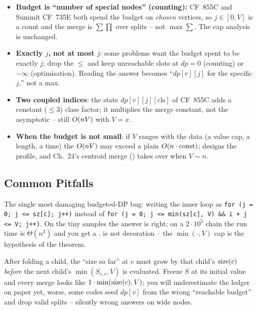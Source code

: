 \begin{itemize}[nosep]
  \item \textbf{Budget is ``number of special nodes'' (counting):} CF~855C and
        Summit CF~735E both spend the budget on \emph{chosen} vertices, so
        $j\in[0,V]$ is a count and the merge is $\sum\!\prod$ over splits --
        not $\max\!\sum$. The cap analysis is unchanged. \hfill{}
  \item \textbf{Exactly $j$, not at most $j$}: some problems want the budget
        spent to be exactly $j$; drop the $\le$ and keep unreachable slots at
        $\mathit{dp}=0$ (counting) or $-\infty$ (optimisation). Reading the
        answer becomes ``$\mathit{dp}[r][j]$ for the specific $j$,'' not a max. \hfill{}
  \item \textbf{Two coupled indices}: the state $\mathit{dp}[v][j][\text{cls}]$
        of CF~855C adds a constant ($\le 3$) class factor; it multiplies the
        merge constant, not the asymptotic -- still $O(nV)$ with $V=x$. \hfill{}
  \item \textbf{When the budget is not small}: if $V$ ranges with the data
        (a value cap, a length, a time) the $O(nV)$ may exceed a plain
        $O(n\cdot\text{const})$;  designs the profile,
        and Ch.~24's centroid merge () takes over when $V \sim n$. \hfill{}
\end{itemize}

\subsection{Common Pitfalls}

\begin{warningbox}
The single most damaging budgeted-DP bug: writing the inner loop as
\lstinline{for (j = 0; j <= sz[c]; j++)} instead of
\lstinline{for (j = 0; j <= min(sz[c], V) && i + j <= V; j++)}. On the tiny
samples the answer is right; on a $2\cdot10^{5}$ chain the run time is
$\Theta(n^2)$ and you get a \tle.  is not decoration --
the $\min(\cdot,V)$ cap is the hypothesis of the theorem.
\end{warningbox}

\begin{warningbox}
After folding a child, the ``size so far'' at $v$ must grow by that child's
$\operatorname{size}(c)$ \emph{before} the next child's $\min(S_{v,c},V)$ is evaluated.
Freeze $S$ at its initial value and every merge looks like $1 \cdot \min(\operatorname{size}(c),V)$;
you will underestimate the ledger on paper yet, worse, some codes seed
$\mathit{dp}[v]$ from the wrong ``reachable budget'' and drop valid splits --
silently wrong answers on wide nodes.
\end{warningbox}

